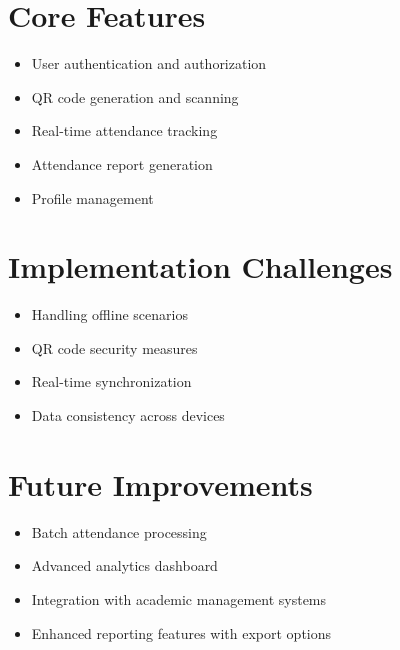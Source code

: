 \documentclass[12pt,a4paper]{report}
\begin{document}
\section{Core Features}
\begin{itemize}
    \item User authentication and authorization
    \item QR code generation and scanning
    \item Real-time attendance tracking
    \item Attendance report generation
    \item Profile management
\end{itemize}

\section{Implementation Challenges}
\begin{itemize}
    \item Handling offline scenarios
    \item QR code security measures
    \item Real-time synchronization
    \item Data consistency across devices
\end{itemize}

\section{Future Improvements}
\begin{itemize}
    \item Batch attendance processing
    \item Advanced analytics dashboard
    \item Integration with academic management systems
    \item Enhanced reporting features with export options
\end{itemize}
\end{document}
